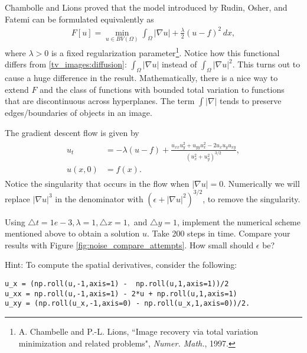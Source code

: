 Chambolle and Lions proved that the model introduced by Rudin, Osher, and Fatemi can be formulated equivalently as
\begin{align}
F[u] = \min_{u \in BV(\Omega)} \int_{\Omega} |\nabla u| + \frac{\lambda}{2}(u-f)^2 \, dx,
\end{align}
where $\lambda >0$ is a fixed regularization parameter\footnote{A. Chambelle and P.-L. Lions, ``Image recovery via total variation minimization and related problems", \emph{Numer. Math.}, 1997.}. Notice how this functional differs from \eqref{tv_images:diffusion}: $\int_{\Omega} |\nabla u|$ instead of $\int_{\Omega} |\nabla u|^2$. This turns out to cause a huge difference in the result.  Mathematically, there is a nice way to extend $F$ and the class of functions with bounded total variation to functions that are discontinuous across hyperplanes. The term $\int |\nabla|$ tends to preserve edges/boundaries of objects in an image.


The gradient descent flow is given by
\begin{align}
    \begin{split}
u_t &= -\lambda (u-f) + \frac{u_{xx}u_y^2 + u_{yy}u_x^2 - 2u_xu_yu_{xy}}{(u_x^2 + u_y^2)^{3/2}} ,\\
u(x,0) &= f(x).
\end{split} \label{tv_images:tv_flow}
\end{align}
Notice the singularity that occurs in the flow when $|\nabla u| = 0$. Numerically we will replace  $|\nabla u|^{3}$ in the denominator with $(\epsilon + |\nabla u|^{2})^{3/2}$, to remove the singularity.


\begin{problem}
Using $\triangle t = 1e-3, \lambda = 1, \triangle x = 1,$ and $ \triangle y = 1$, implement the numerical scheme mentioned above to obtain a solution $u$.  Take 200 steps in time. Compare your results with Figure \ref{fig:noise_compare_attempts}. How small should $\epsilon$ be?

Hint: To compute the spatial derivatives, consider the following:
\begin{lstlisting}
u_x = (np.roll(u,-1,axis=1) -  np.roll(u,1,axis=1))/2
u_xx = np.roll(u,-1,axis=1) - 2*u + np.roll(u,1,axis=1)
u_xy = (np.roll(u_x,-1,axis=0) - np.roll(u_x,1,axis=0))/2.
\end{lstlisting}
\end{problem}


